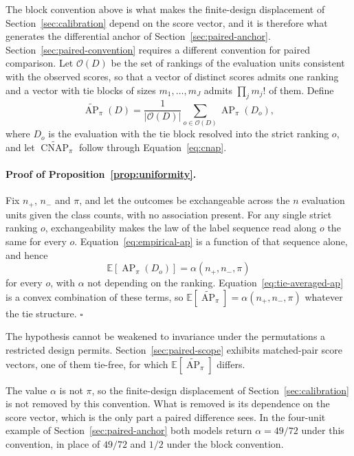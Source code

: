 \documentclass[11pt]{article}
\newcommand{\AP}{\operatorname{AP}}
\newcommand{\CNAP}{\operatorname{CNAP}}
\newcommand{\E}{\mathbb{E}}
\newcommand{\APta}{\widetilde{\AP}}
\newcommand{\CNAPta}{\widetilde{\CNAP}}
\theoremstyle{remark}
\begin{document}
The block convention above is what makes the finite-design displacement of Section~\ref{sec:calibration} depend on the score vector, and it is therefore what generates the differential anchor of Section~\ref{sec:paired-anchor}. Section~\ref{sec:paired-convention} requires a different convention for paired comparison. Let $\mathcal{O}(D)$ be the set of rankings of the evaluation units consistent with the observed scores, so that a vector of distinct scores admits one ranking and a vector with tie blocks of sizes $m_1,\ldots,m_J$ admits $\prod_j m_j!$ of them. Define
\begin{equation}
\APta_\pi(D)
=
\frac{1}{|\mathcal{O}(D)|}
\sum_{o\in\mathcal{O}(D)}
\AP_\pi(D_o),
\label{eq:tie-averaged-ap}
\end{equation}
where $D_o$ is the evaluation with the tie block resolved into the strict ranking $o$, and let $\CNAPta_\pi$ follow through Equation~\eqref{eq:cnap}.

\paragraph{Proof of Proposition~\ref{prop:uniformity}.}
Fix $n_+$, $n_-$ and $\pi$, and let the outcomes be exchangeable across the $n$ evaluation units given the class counts, with no association present. For any single strict ranking $o$, exchangeability makes the law of the label sequence read along $o$ the same for every $o$. Equation~\eqref{eq:empirical-ap} is a function of that sequence alone, and hence
\[
\E\left[\AP_\pi(D_o)\right]
=
\alpha(n_+,n_-,\pi)
\]
for every $o$, with $\alpha$ not depending on the ranking. Equation~\eqref{eq:tie-averaged-ap} is a convex combination of these terms, so $\E[\APta_\pi]=\alpha(n_+,n_-,\pi)$ whatever the tie structure. $\square$

The hypothesis cannot be weakened to invariance under the permutations a restricted design permits. Section~\ref{sec:paired-scope} exhibits matched-pair score vectors, one of them tie-free, for which $\E[\APta_\pi]$ differs.

The value $\alpha$ is not $\pi$, so the finite-design displacement of Section~\ref{sec:calibration} is not removed by this convention. What is removed is its dependence on the score vector, which is the only part a paired difference sees. In the four-unit example of Section~\ref{sec:paired-anchor} both models return $\alpha=49/72$ under this convention, in place of $49/72$ and $1/2$ under the block convention.
\end{document}
